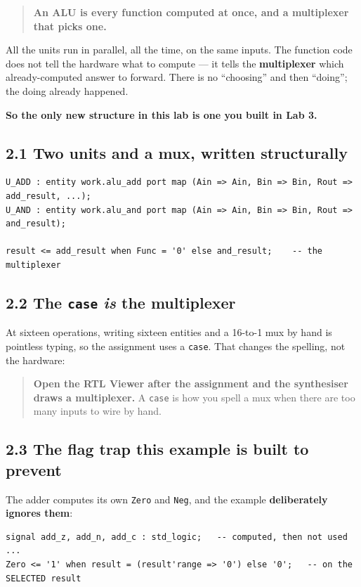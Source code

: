 \documentclass[11pt]{article}
\newcommand{\code}[1]{\texttt{#1}}
\begin{document}
\begin{quote}
\textbf{An ALU is every function computed at once, and a multiplexer that picks
one.}
\end{quote}

All the units run in parallel, all the time, on the same inputs. The function code
does not tell the hardware what to compute --- it tells the \textbf{multiplexer}
which already-computed answer to forward. There is no ``choosing'' and then
``doing''; the doing already happened.

\textbf{So the only new structure in this lab is one you built in Lab 3.}

\subsection*{2.1 Two units and a mux, written structurally}

\begin{lstlisting}
U_ADD : entity work.alu_add port map (Ain => Ain, Bin => Bin, Rout => add_result, ...);
U_AND : entity work.alu_and port map (Ain => Ain, Bin => Bin, Rout => and_result);

result <= add_result when Func = '0' else and_result;    -- the multiplexer
\end{lstlisting}

\subsection*{2.2 The \code{case} \emph{is} the multiplexer}

At sixteen operations, writing sixteen entities and a 16-to-1 mux by hand is
pointless typing, so the assignment uses a \code{case}. That changes the spelling,
not the hardware:

\begin{quote}
\textbf{Open the RTL Viewer after the assignment and the synthesiser draws a
multiplexer.} A \code{case} is how you spell a mux when there are too many inputs
to wire by hand.
\end{quote}

\subsection*{2.3 The flag trap this example is built to prevent}

The adder computes its own \code{Zero} and \code{Neg}, and the example
\textbf{deliberately ignores them}:

\begin{lstlisting}
signal add_z, add_n, add_c : std_logic;   -- computed, then not used
...
Zero <= '1' when result = (result'range => '0') else '0';   -- on the SELECTED result
\end{lstlisting}
\end{document}
